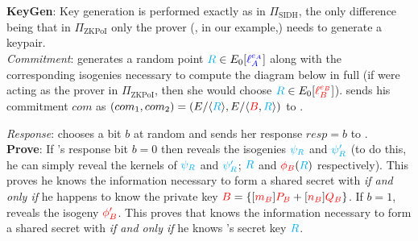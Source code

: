\noindent
\textbf{KeyGen}: Key generation is performed exactly as in $\Pi_{\text{SIDH}}$, the only difference being that in $\Pi_{\text{ZKPoI}}$ only the prover (\bob, in our example,) needs to generate a keypair.\\

\noindent
\emph{Commitment}: \bob generates a random point $\textcolor{cyan}{R} \in E_0[\textcolor{blue}{\ell_{A}^{e_A}}]$ along with the corresponding isogenies necessary to compute the diagram below in full (if \alice were acting as the prover in $\Pi_{\text{ZKPoI}}$, then she would choose $\textcolor{cyan}{R} \in E_0[\textcolor{red}{\ell_{B}^{e_B}}]$). \bob sends his commitment $com$ as $(com_1,com_2) = (E/\langle \textcolor{cyan}{R} \rangle, E/\langle \textcolor{red}{B}, \textcolor{cyan}{R} \rangle)$ to \alice.\\

\begin{center}
\end{center}

\noindent
\emph{Response}: \alice chooses a bit $b$ at random and sends her response $resp = b$ to \bob.\\

\noindent
\textbf{Prove}: If \alice's response bit $b = 0$ then \bob reveals the isogenies $\textcolor{cyan}{\psi_R}$ and $\textcolor{cyan}{\psi'_R}$ (to do this, he can simply reveal the kernels of $\textcolor{cyan}{\psi_R}$ and $\textcolor{cyan}{\psi'_R}$; $\textcolor{cyan}{R}$ and $\textcolor{red}{\phi_B}(\textcolor{cyan}{R})$ respectively). This proves he knows the information necessary to form a shared secret with \randall \emph{if and only if} he happens to know the private key $\textcolor{red}{B} = \{[\textcolor{red}{m_B}]\textcolor{red}{P_B} + [\textcolor{red}{n_B}]\textcolor{red}{Q_B}\}$. If $b = 1$, \bob reveals the isogeny $\textcolor{red}{\phi'_B}$. This proves that \bob knows the information necessary to form a shared secret with \randall \emph{if and only if} he knows \randall's secret key $\textcolor{cyan}{R}$.\\

